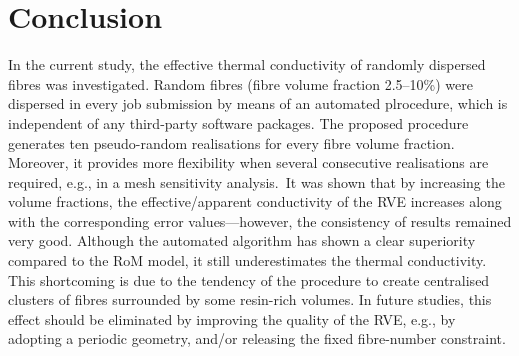 \bl
	

\section{Conclusion}
	In the current study, the effective thermal conductivity of randomly dispersed fibres was investigated. Random fibres (fibre volume fraction 2.5--10\%) were dispersed in every job submission by means of an automated plrocedure, which is independent of any third-party software packages. The proposed procedure generates ten pseudo-random realisations for every fibre volume fraction. Moreover, it provides more flexibility when several consecutive realisations are required, e.g., in a mesh sensitivity analysis.\red\ It was shown that by increasing the volume fractions, the effective/apparent conductivity of the RVE increases along with the corresponding error values---however, the consistency of results remained very good. Although the automated algorithm has shown a clear superiority compared to the RoM model, it still underestimates the thermal conductivity. This shortcoming is due to the tendency of the procedure to create centralised clusters of fibres surrounded by some resin-rich volumes. In future studies, this effect should be eliminated by improving the quality of the RVE, e.g., by adopting a periodic geometry, and/or releasing the fixed fibre-number constraint.\bl
	
	

